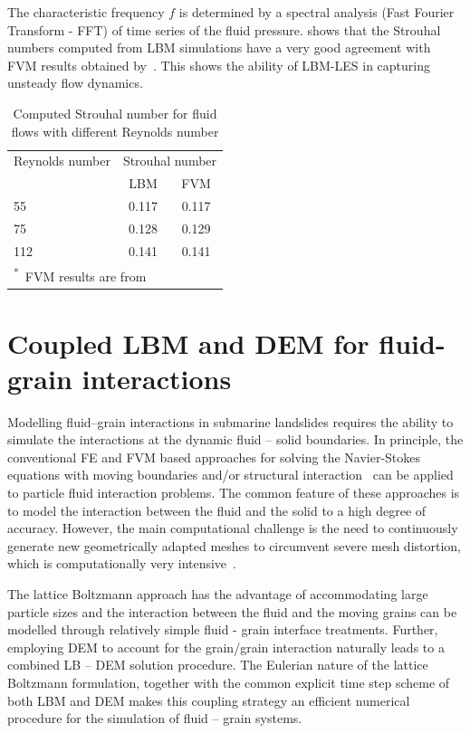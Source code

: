\noindent The characteristic frequency $f$ is determined by a spectral 
analysis (Fast Fourier Transform - FFT) of time series of the fluid pressure. 
 shows that the Strouhal numbers computed from LBM 
simulations have a very good agreement with FVM results obtained 
by~\citet{Breuer2000}. This shows the ability of LBM-LES in capturing unsteady 
flow dynamics.


\begin{table}[tbhp]
	\caption{Computed Strouhal number for fluid flows with different Reynolds 
	number}
	\label{table:strouhal}
	\centering
	\begin{tabular}{l c c}
		\toprule
		Reynolds number & \multicolumn{2}{c}{Strouhal number} \\
		\cmidrule{2-3}
		& LBM & FVM \\
		\midrule
		55		& 0.117	 &	0.117 \\
		75		& 0.128	 &	0.129 \\
		112		& 0.141  &	0.141 \\
		\bottomrule
		\multicolumn{3}{l}{\footnotesize{\textsuperscript{*}~FVM results are 
		from~\citet{Breuer2000}}}
	\end{tabular}
\end{table}




\section{Coupled LBM and DEM for fluid-grain interactions}

Modelling fluid--grain interactions in submarine landslides requires the 
ability to simulate the interactions at the dynamic fluid -- solid boundaries. 
In principle, the conventional FE and FVM based approaches for solving the 
Navier-Stokes equations with moving boundaries and/or structural 
interaction~\citep{Bathe2004} can be applied to particle fluid interaction 
problems. The common feature of these approaches is to model the interaction 
between the fluid and the solid to a high degree of accuracy. However, the main 
computational challenge is the need to continuously generate new geometrically 
adapted meshes to circumvent severe mesh distortion, which is computationally 
very intensive~\citep{Han2007a}. 

The lattice Boltzmann approach has the advantage of accommodating large 
particle sizes and the interaction between the fluid and the moving grains 
can be modelled through relatively simple fluid - grain interface treatments. 
Further, employing DEM to account for the grain/grain interaction naturally 
leads to a combined LB -- DEM solution procedure. The Eulerian nature 
of the lattice Boltzmann formulation, together with the common explicit time 
step scheme of both LBM and DEM makes this coupling strategy an efficient 
numerical procedure for the simulation of fluid -- grain systems. 

